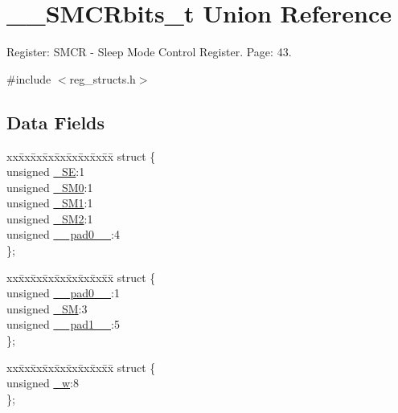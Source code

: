 \hypertarget{union_____s_m_c_rbits__t}{\section{\+\_\+\+\_\+\+S\+M\+C\+Rbits\+\_\+t Union Reference}
\label{union_____s_m_c_rbits__t}
}


Register\+: S\+M\+C\+R -\/ Sleep Mode Control Register. Page\+: 43.  




{\ttfamily \#include $<$reg\+\_\+structs.\+h$>$}

\subsection*{Data Fields}
\begin{DoxyCompactItemize}
\item 
\begin{tabbing}
xx\=xx\=xx\=xx\=xx\=xx\=xx\=xx\=xx\=\kill
struct \{\\
\>unsigned \hyperlink{union_____s_m_c_rbits__t_a42f1fc801e912753b7c73de029b38786}{\_SE}:1\\
\>unsigned \hyperlink{union_____s_m_c_rbits__t_a9a63896db6eb16eff5b3a087850b74a9}{\_SM0}:1\\
\>unsigned \hyperlink{union_____s_m_c_rbits__t_a8c57caf18c78035bd0ac83ddc64a05af}{\_SM1}:1\\
\>unsigned \hyperlink{union_____s_m_c_rbits__t_a5a220849d4a6c89d4cca84222a9df5cc}{\_SM2}:1\\
\>unsigned \hyperlink{union_____s_m_c_rbits__t_aa8bb506be2d939396e10e1c44ab30324}{\_\_pad0\_\_}:4\\
\}; \\

\end{tabbing}\item 
\begin{tabbing}
xx\=xx\=xx\=xx\=xx\=xx\=xx\=xx\=xx\=\kill
struct \{\\
\>unsigned \hyperlink{union_____s_m_c_rbits__t_aa8bb506be2d939396e10e1c44ab30324}{\_\_pad0\_\_}:1\\
\>unsigned \hyperlink{union_____s_m_c_rbits__t_a61d30a94b0e4946af3d9f7fb1efe0ca1}{\_SM}:3\\
\>unsigned \hyperlink{union_____s_m_c_rbits__t_acc2771fc7bef1f9912bbe13009c1ccb7}{\_\_pad1\_\_}:5\\
\}; \\

\end{tabbing}\item 
\begin{tabbing}
xx\=xx\=xx\=xx\=xx\=xx\=xx\=xx\=xx\=\kill
struct \{\\
\>unsigned \hyperlink{union_____s_m_c_rbits__t_a715eaad7b2b47e45cacd7e59f3580c68}{\_w}:8\\
\}; \\

\end{tabbing}\end{DoxyCompactItemize}


